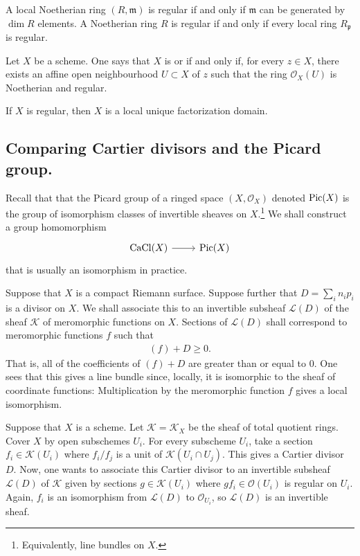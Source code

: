 \documentclass [11 pt, oneside] {article}
\begin{document}
A local Noetherian ring $(R,\mathfrak{m})$ is {regular} if and only if $\mathfrak{m}$ can be generated by $\dim R$ elements. A Noetherian ring $R$ is {regular} if and only if every local ring $R_{\mathfrak{p}}$ is regular.

\begin{definition}\label{}\text{}
Let $X$ be a scheme. One says that $X$ is  or  if and only if, for every $z\in X$, there exists an affine open neighbourhood $U\subset X$ of $z$ such that the ring $\mathscr{O}_X(U)$ is Noetherian and regular.
\end{definition}

If $X$ is regular, then $X$ is a local unique factorization domain.

\subsection{Comparing Cartier divisors and the Picard group.}
Recall that that the Picard group of a ringed space $(X,\mathscr{O}_X)$ denoted $\operatorname{Pic} (X)$ is the group of isomorphism classes of invertible sheaves on $X$.\footnote{Equivalently, line bundles on $X$.} We shall construct a group homomorphism
\[
\begin{tikzcd}
	\CaCl(X) \ar[r]&\Pic(X)
\end{tikzcd}
\]
that is usually an isomorphism in practice.

Suppose that $X$ is a compact Riemann surface. Suppose further that $D=\sum_{i}^{} n_ip_i$ is a divisor on $X$. We shall associate this to an invertible subsheaf $\mathscr{L}(D)$ of the sheaf $\mathscr{K}$ of meromorphic functions on $X$. Sections of $\mathscr{L}(D)$ shall correspond to meromorphic functions $f$ such that
\begin{align*}
	(f) + D \ge 0.
\end{align*}
That is, all of the coefficients of $(f)+D$ are greater than or equal to $0$. One sees that this gives a line bundle since, locally, it is isomorphic to the sheaf of coordinate functions: Multiplication by the meromorphic function $f$ gives a local isomorphism.

Suppose that $X$ is a scheme. Let $\mathscr{K}=\mathscr{K}_X$ be the sheaf of total quotient rings. Cover $X$ by open subschemes $U_i$. For every subscheme $U_i$, take a section $f_i\in \mathscr{K}({U_i})$ where $f_i/f_j$ is a unit of $\mathscr{K}({U_i\cap U_j})$. This gives a Cartier divisor $D$. Now, one wants to associate this Cartier divisor to an invertible subsheaf $\mathscr{L}(D)$ of $\mathscr{K}$ given by sections $g\in \mathscr{K}({U_i})$ where $gf_i\in \mathscr{O}({U_i})$ is regular on $U_i$. Again, $f_i$ is an isomorphism from $\mathscr{L}(D)$ to $\mathscr{O}_{U_i}$, so $\mathscr{L}(D)$ is an invertible sheaf. 
\end{document}

